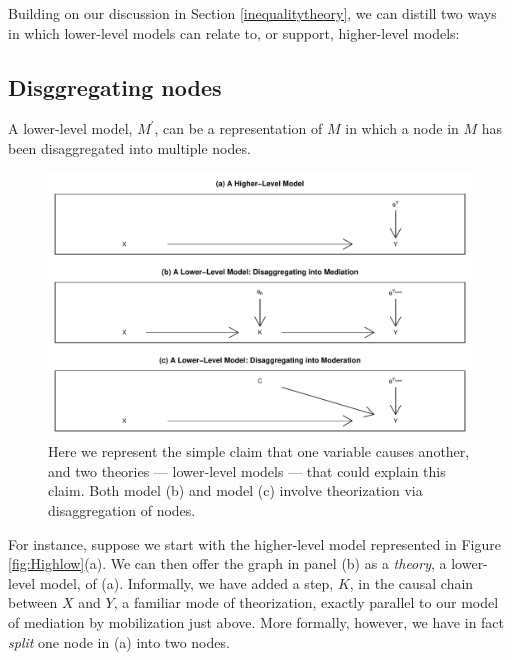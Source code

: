 \documentclass[12pt,]{book}
\begin{document}
Building on our discussion in Section \ref{inequalitytheory}, we can distill two ways in which lower-level models can relate to, or support, higher-level models:

\hypertarget{disggregating-nodes}{%
\subsection{Disggregating nodes}\label{disggregating-nodes}}

A lower-level model, \(M^\prime\), can be a representation of \(M\) in which a node in \(M\) has been disaggregated into multiple nodes.

\begin{figure}

{\centering \includegraphics[width=.5\textwidth]{ii_files/figure-latex/unnamed-chunk-12-1} 

}

\caption{\label{fig:Highlow} Here we represent the simple claim that one variable causes another, and two theories --- lower-level models --- that could explain this claim. Both model (b) and model (c) involve theorization via disaggregation of nodes.}\label{fig:unnamed-chunk-12}
\end{figure}

For instance, suppose we start with the higher-level model represented in Figure \ref{fig:Highlow}(a). We can then offer the graph in panel (b) as a \emph{theory}, a lower-level model, of (a). Informally, we have added a step, \(K\), in the causal chain between \(X\) and \(Y\), a familiar mode of theorization, exactly parallel to our model of mediation by mobilization just above. More formally, however, we have in fact \emph{split} one node in (a) into two nodes.
\end{document}
